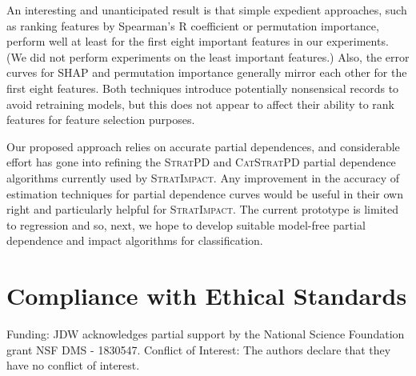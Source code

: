 \documentclass[smallextended]{svjour3}       %
\newcommand{\cut}[1]{}
\newcommand{\simp}{\fontfamily{cmr}\textsc{\small StratImpact}}
\newcommand{\spd}{\fontfamily{cmr}\textsc{\small StratPD}}
\newcommand{\cspd}{\fontfamily{cmr}\textsc{\small CatStratPD}}
\begin{document}
An interesting and unanticipated result is that simple expedient approaches, such as ranking features by Spearman's R coefficient or permutation importance, perform well at least for the first eight important features in our experiments. (We did not perform experiments on the least important features.) Also, the error curves for SHAP and permutation importance generally mirror each other for the first eight features.  Both techniques introduce potentially nonsensical records to avoid retraining models, but this does not appear to affect their ability to rank features for feature selection purposes.

Our proposed approach relies on accurate partial dependences, and considerable effort has gone into refining the \spd{} and \cspd{} partial dependence algorithms currently used by \simp.  Any improvement in the accuracy of estimation techniques for partial dependence curves would be useful in their own right and particularly helpful for \simp.  The current prototype is limited to regression and so, next, we hope to develop suitable model-free partial dependence and impact algorithms for classification.

\cut{
\begin{figure}
\centering
\begin{subfigure}{1\textwidth}
    \centering
\texttt{[image: images/boston-features.pdf]}
\texttt{[image: images/boston-features-shap-rf.pdf]}
\vspace{-2mm}\subcaption{\footnotesize Note LSTAT/RM order is diff than in original figure as their is high variance}\vspace{3mm}
\end{subfigure}%
\hfill
\begin{subfigure}{1\textwidth}
    \centering
\texttt{[image: images/flights-features.pdf]}
\texttt{[image: images/flights-features-shap-rf.pdf]}
\vspace{-2mm}\subcaption{\footnotesize 5.8M records}\vspace{3mm}
\end{subfigure}
\hfill
\begin{subfigure}{1\textwidth}
    \centering
\texttt{[image: images/bulldozer-features.pdf]}
\texttt{[image: images/bulldozer-features-shap-rf.pdf]}
\vspace{-2mm}\subcaption{\footnotesize foo}\vspace{3mm}
\end{subfigure}%
\hfill
\begin{subfigure}{1\textwidth}
    \centering
\texttt{[image: images/rent-features.pdf]}
\texttt{[image: images/rent-features-shap-rf.pdf]}
\vspace{-2mm}\subcaption{\footnotesize foo}\vspace{3mm}
\end{subfigure}
\caption[short]{blorttttt}
\label{fig:features}
\end{figure}
}

\section{Compliance with Ethical Standards}
Funding: JDW acknowledges partial support by the National Science Foundation grant NSF DMS - 1830547. Conflict of Interest: The authors declare that they have no conflict of interest.

\end{document}
